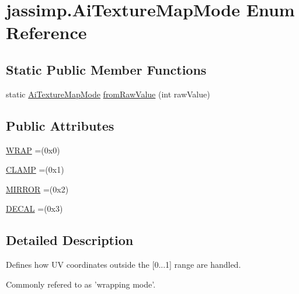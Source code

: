 \hypertarget{enumjassimp_1_1_ai_texture_map_mode}{\section{jassimp.\+Ai\+Texture\+Map\+Mode Enum Reference}
\label{enumjassimp_1_1_ai_texture_map_mode}
}
\subsection*{Static Public Member Functions}
\begin{DoxyCompactItemize}
\item 
static \hyperlink{enumjassimp_1_1_ai_texture_map_mode}{Ai\+Texture\+Map\+Mode} \hyperlink{enumjassimp_1_1_ai_texture_map_mode_a4c45c353deea0a5fb476b491f0c54909}{from\+Raw\+Value} (int raw\+Value)
\end{DoxyCompactItemize}
\subsection*{Public Attributes}
\begin{DoxyCompactItemize}
\item 
\hyperlink{enumjassimp_1_1_ai_texture_map_mode_a3c555f48584add1d53a6d091bd7c9500}{W\+R\+A\+P} =(0x0)
\item 
\hyperlink{enumjassimp_1_1_ai_texture_map_mode_aa1f9a6f04fe4545ffbe69cf42559d8ce}{C\+L\+A\+M\+P} =(0x1)
\item 
\hyperlink{enumjassimp_1_1_ai_texture_map_mode_ab6ad139b097429504f972893a22da90e}{M\+I\+R\+R\+O\+R} =(0x2)
\item 
\hyperlink{enumjassimp_1_1_ai_texture_map_mode_ab2c9025bdb3239db16d681f368bb61ac}{D\+E\+C\+A\+L} =(0x3)
\end{DoxyCompactItemize}


\subsection{Detailed Description}
Defines how U\+V coordinates outside the \mbox{[}0...1\mbox{]} range are handled.

Commonly refered to as 'wrapping mode'. 

